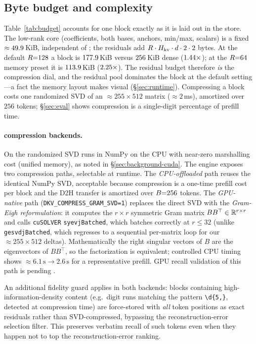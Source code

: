 \subsection{Byte budget and complexity}
Table~\ref{tab:budget} accounts for one block exactly as it is laid out in the store. The low-rank
core (coefficients, both bases, anchors, min/max, scalars) is a fixed $\approx49.9$\,KiB,
independent of \maxres{}; the residuals add $R\cdot H_{\mathrm{kv}}\cdot d\cdot2\cdot2$ bytes. At the
default $R{=}128$ a block is $177.9$\,KiB versus $256$\,KiB dense
($1.44\times$); at the $R{=}64$ memory preset it is $113.9$\,KiB
($2.25\times$). The residual budget therefore \emph{is} the compression dial, and the
residual pool dominates the block at the default setting---a fact the memory layout makes visual
(\S\ref{sec:runtime}). Compressing a block costs one randomized SVD of an $\approx255\times512$
matrix ($\approx2$\,ms), amortized over $256$ tokens; \S\ref{sec:eval} shows compression is a
single-digit percentage of prefill time.

\paragraph{\cuda{} compression backends.}
On \mlxe{} the randomized SVD runs in NumPy on the CPU with near-zero marshalling cost (unified
memory), as noted in \S\ref{sec:background-cuda}. The \cuda{} engine exposes two compression
paths, selectable at runtime. The \emph{CPU-offloaded} path reuses the identical NumPy SVD,
acceptable because compression is a one-time prefill cost per block and the D2H transfer is
amortized over $B{=}256$ tokens. The \emph{GPU-native} path
(\texttt{DKV\_COMPRESS\_GRAM\_SVD=1}) replaces the direct SVD with the \emph{Gram-Eigh
reformulation}: it computes the $r{\times}r$ symmetric Gram matrix
$B B^\top \in\mathbb{R}^{r\times r}$ and calls \texttt{cuSOLVER} \texttt{syevjBatched}, which batches
correctly at $r{\le}32$ (unlike \texttt{gesvdjBatched}, which regresses to a sequential per-matrix
loop for our $\approx255{\times}512$ deltas). Mathematically the right singular vectors of $B$ are
the eigenvectors of $B B^\top$, so the factorization is equivalent; controlled CPU timing
shows $\approx6.1\,\text{s}\to2.6\,\text{s}$ for a representative prefill.
GPU recall validation of this path is pending \pendingGPU{}.

An additional fidelity guard applies in both backends: blocks containing high-information-density
content (e.g.\ digit runs matching the pattern \texttt{\textbackslash d\{5,\}}, detected at compression time)
are force-stored with \emph{all} token positions as exact residuals rather than SVD-compressed,
bypassing the reconstruction-error selection filter. This preserves verbatim recall of such
tokens even when they happen not to top the reconstruction-error ranking.


